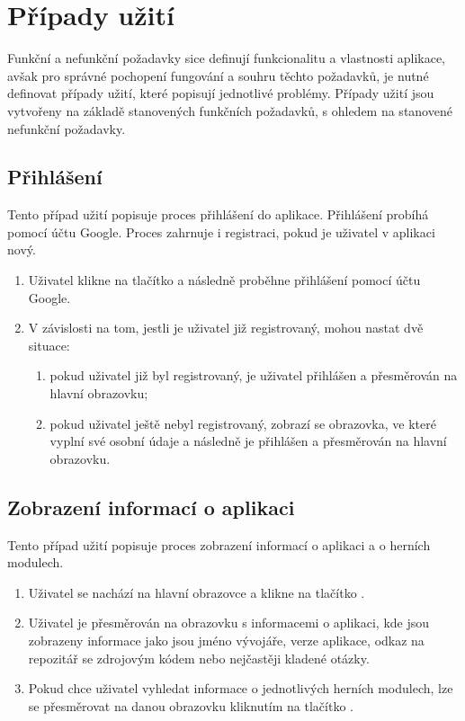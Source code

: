 \let\oldsubsection=\thesubsection
\renewcommand\thesubsection{UC\arabic{subsection}} %

\section{Případy užití}

Funkční a nefunkční požadavky sice definují funkcionalitu a vlastnosti aplikace,
avšak pro správné pochopení fungování a souhru těchto požadavků,
je nutné definovat případy užití,
které popisují jednotlivé problémy.
Případy užití jsou vytvořeny na základě stanovených funkčních požadavků,
s ohledem na stanovené nefunkční požadavky.

\subsection{Přihlášení}
\label{uc:login}

Tento případ užití popisuje proces přihlášení do aplikace.
Přihlášení probíhá pomocí účtu Google.
Proces zahrnuje i registraci,
pokud je uživatel v aplikaci nový.

\begin{enumerate}
    \item Uživatel klikne na tlačítko 
    a následně proběhne přihlášení pomocí účtu Google.
    \item V závislosti na tom,
    jestli je uživatel již registrovaný,
    mohou nastat dvě situace:
    \begin{enumerate}
        \item pokud uživatel již byl registrovaný,
        je uživatel přihlášen a přesměrován na hlavní obrazovku;
        \item pokud uživatel ještě nebyl registrovaný,
        zobrazí se obrazovka,
        ve které vyplní své osobní údaje
        a následně je přihlášen a přesměrován na hlavní obrazovku.
    \end{enumerate}
\end{enumerate}

\subsection{Zobrazení informací o aplikaci}

Tento případ užití popisuje proces zobrazení informací o aplikaci
a o herních modulech.

\begin{enumerate}
    \item Uživatel se nachází na hlavní obrazovce a klikne na tlačítko
    .
    \item Uživatel je přesměrován na obrazovku s informacemi o aplikaci,
    kde jsou zobrazeny informace jako jsou jméno vývojáře, verze aplikace,
    odkaz na repozitář se zdrojovým kódem nebo nejčastěji kladené otázky.
    \item Pokud chce uživatel vyhledat informace o jednotlivých herních
    modulech,
    lze se přesměrovat na danou obrazovku kliknutím na tlačítko
    .
\end{enumerate}

